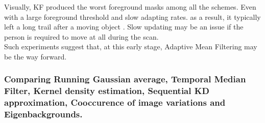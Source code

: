 Visually, KF produced the worst foreground masks among all the schemes. Even with a large foreground threshold and slow adapting rates. as a result, it typically left a long trail after a moving object \cite{Cheung2007}. Slow updating may be an issue if the  person is required to move at all during the scan.\\

Such experiments suggest that, at this early stage, Adaptive Mean Filtering may be the way forward.\\


\subsubsection{Comparing Running Gaussian average, Temporal Median Filter, Kernel density estimation, Sequential KD approximation, Cooccurence of image variations and Eigenbackgrounds.}